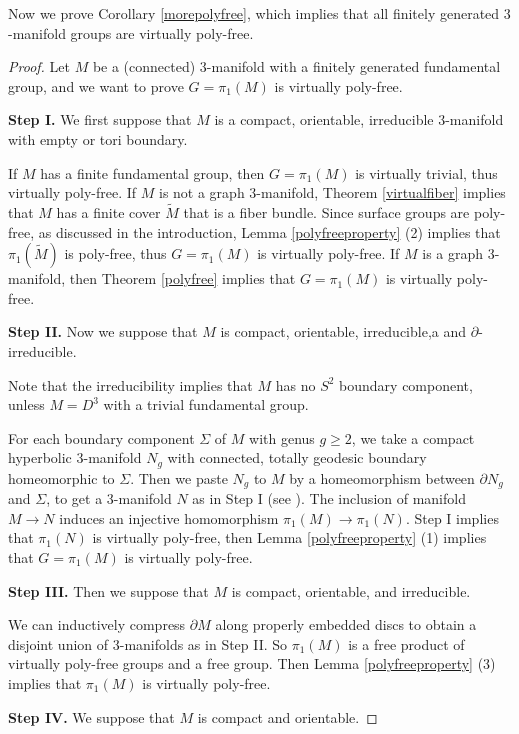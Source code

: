 \documentclass{amsart}
\numberwithin{equation}{section}
\theoremstyle{definition}
\begin{document}
Now we prove Corollary \ref{morepolyfree}, which implies that all finitely generated $3$-manifold groups are virtually poly-free.

\begin{proof}
Let $M$ be a (connected) $3$-manifold with a finitely generated fundamental group, and we want to prove $G=\pi_1(M)$ is virtually poly-free.

{\bf Step I.} We first suppose that $M$ is a compact, orientable, irreducible $3$-manifold with empty or tori boundary. 

If $M$ has a finite fundamental group, then $G=\pi_1(M)$ is virtually trivial, thus virtually poly-free.
If $M$ is not a graph $3$-manifold, Theorem \ref{virtualfiber} implies that $M$ has a finite cover $\tilde{M}$ that is a fiber bundle. Since surface groups are poly-free, as discussed in the introduction, Lemma \ref{polyfreeproperty} (2) implies that $\pi_1(\tilde{M})$ is poly-free, thus $G=\pi_1(M)$ is virtually poly-free. If $M$ is a graph $3$-manifold, then Theorem \ref{polyfree} implies that $G=\pi_1(M)$ is virtually poly-free.

{\bf Step II.} Now we suppose that $M$ is compact, orientable, irreducible,a and $\partial$-irreducible. 

Note that the irreducibility implies that $M$ has no $S^2$ boundary component, unless $M=D^3$ with a trivial fundamental group.

For each boundary component $\Sigma$ of $M$ with genus $g\geq 2$, we take a compact hyperbolic $3$-manifold $N_g$ with connected, totally geodesic boundary homeomorphic to $\Sigma$. Then we paste $N_g$ to $M$ by a homeomorphism between $\partial N_g$ and $\Sigma$, to get a $3$-manifold $N$ as in Step I (see \cite[Section 6.3]{Sun}). The inclusion of manifold $M\to N$ induces an injective homomorphism $\pi_1(M)\to \pi_1(N)$. Step I implies that $\pi_1(N)$ is virtually poly-free, then Lemma \ref{polyfreeproperty} (1) implies that $G=\pi_1(M)$ is virtually poly-free.

{\bf Step III.} Then we suppose that $M$ is compact, orientable, and irreducible. 

We can inductively compress $\partial M$ along properly embedded discs to obtain a disjoint union of $3$-manifolds as in Step II. So $\pi_1(M)$ is a free product of virtually poly-free groups and a free group. Then Lemma \ref{polyfreeproperty} (3) implies that $\pi_1(M)$ is virtually poly-free.

{\bf Step IV.} We suppose that $M$ is compact and orientable.


\end{proof}
\end{document}

